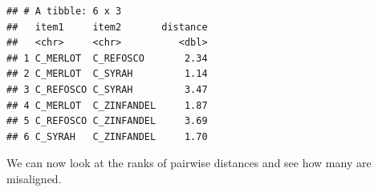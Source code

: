 \documentclass[
]{book}
\newenvironment{Shaded}{\begin{snugshade}}{\end{snugshade}}
\newcommand{\AttributeTok}[1]{\textcolor[rgb]{0.13,0.29,0.53}{#1}}
\newcommand{\CommentTok}[1]{\textcolor[rgb]{0.56,0.35,0.01}{\textit{#1}}}
\newcommand{\ConstantTok}[1]{\textcolor[rgb]{0.56,0.35,0.01}{#1}}
\newcommand{\FunctionTok}[1]{\textcolor[rgb]{0.13,0.29,0.53}{\textbf{#1}}}
\newcommand{\NormalTok}[1]{#1}
\newcommand{\OtherTok}[1]{\textcolor[rgb]{0.56,0.35,0.01}{#1}}
\newcommand{\SpecialCharTok}[1]{\textcolor[rgb]{0.81,0.36,0.00}{\textbf{#1}}}
\newcommand{\StringTok}[1]{\textcolor[rgb]{0.31,0.60,0.02}{#1}}
\begin{document}
\begin{Shaded}
\end{Shaded}

\begin{verbatim}
## # A tibble: 6 x 3
##   item1     item2       distance
##   <chr>     <chr>          <dbl>
## 1 C_MERLOT  C_REFOSCO       2.34
## 2 C_MERLOT  C_SYRAH         1.14
## 3 C_REFOSCO C_SYRAH         3.47
## 4 C_MERLOT  C_ZINFANDEL     1.87
## 5 C_REFOSCO C_ZINFANDEL     3.69
## 6 C_SYRAH   C_ZINFANDEL     1.70
\end{verbatim}

We can now look at the ranks of pairwise distances and see how many are misaligned.
\end{document}
